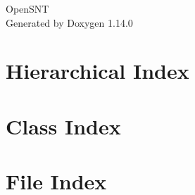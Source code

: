 \documentclass[twoside]{book}
\newcommand{\+}{\discretionary{\mbox{\scriptsize$\hookleftarrow$}}{}{}}
\newcommand{\clearemptydoublepage}{%
    \newpage{\pagestyle{empty}\cleardoublepage}%
  }
\begin{document}
  \raggedbottom
    \hypersetup{pageanchor=false,
                bookmarksnumbered=true,
                pdfencoding=unicode
               }
  \begin{titlepage}
  \vspace*{7cm}
  \begin{center}%
  {\Large Open\+SNT}\\
  \vspace*{1cm}
  {\large Generated by Doxygen 1.14.0}\\
  \end{center}
  \end{titlepage}
  \clearemptydoublepage
  \tableofcontents
  \clearemptydoublepage
  \hypersetup{pageanchor=true}

\chapter{Hierarchical Index}

\chapter{Class Index}

\chapter{File Index}

\end{document}
